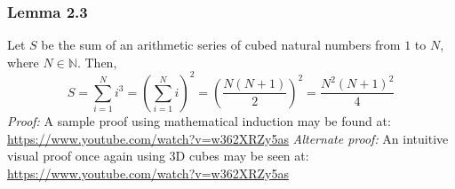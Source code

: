 \documentclass[]{article}
\begin{document}
\subsubsection*{Lemma 2.3}
Let $S$ be the sum of an arithmetic series of cubed natural numbers from $1$ to $N$, where $N \in \mathbb{N}$. Then,
\[S=\sum_{i=1}^{N}i^3=\left(\sum_{i=1}^{N}i\right)^2=\left(\frac{N(N+1)}{2}\right)^2=\frac{N^2(N+1)^2}{4}\]
\textit{Proof:} A sample proof using mathematical induction may be found at: \url{https://www.youtube.com/watch?v=w362XRZy5as}
\textit{Alternate proof:} An intuitive visual proof once again using 3D cubes may be seen at: \url{https://www.youtube.com/watch?v=w362XRZy5as}
\end{document}
